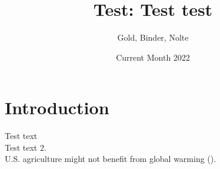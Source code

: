 \documentclass[letterpaper, 10pt]{article}
\title{Test: Test test}
\author{Gold, Binder, Nolte}
\date{Current Month 2022}
\begin{document}
\maketitle

\section{Introduction}
Test text \\
Test text 2. \\
U.S. agriculture might not benefit from global warming (\cite{Schlenker2005}).

\medskip

\printbibliography
\end{document}
